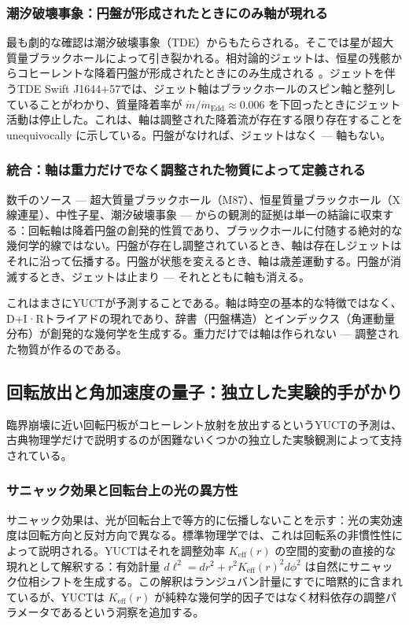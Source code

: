\documentclass[12pt,a4paper]{article}
\begin{document}
	\subsubsection{潮汐破壊事象：円盤が形成されたときにのみ軸が現れる}
	
	最も劇的な確認は潮汐破壊事象（TDE）からもたらされる。そこでは星が超大質量ブラックホールによって引き裂かれる。相対論的ジェットは、恒星の残骸からコヒーレントな降着円盤が形成されたときにのみ生成される \cite{TDE2016,TDE2020}。ジェットを伴うTDE Swift J1644+57では、ジェット軸はブラックホールのスピン軸と整列していることがわかり、質量降着率が \(\dot{m}/\dot{m}_{\text{Edd}} \approx 0.006\) を下回ったときにジェット活動は停止した。これは、軸は調整された降着流が存在する限り存在することを unequivocally に示している。円盤がなければ、ジェットはなく — 軸もない。
	
	\subsubsection{統合：軸は重力だけでなく調整された物質によって定義される}
	
	数千のソース — 超大質量ブラックホール（M87）、恒星質量ブラックホール（X線連星）、中性子星、潮汐破壊事象 — からの観測的証拠は単一の結論に収束する：回転軸は降着円盤の創発的性質であり、ブラックホールに付随する絶対的な幾何学的線ではない。円盤が存在し調整されているとき、軸は存在しジェットはそれに沿って伝播する。円盤が状態を変えるとき、軸は歳差運動する。円盤が消滅するとき、ジェットは止まり — それとともに軸も消える。
	
	これはまさにYUCTが予測することである。軸は時空の基本的な特徴ではなく、D+I·Rトライアドの現れであり、辞書（円盤構造）とインデックス（角運動量分布）が創発的な幾何学を生成する。重力だけでは軸は作られない — 調整された物質が作るのである。
	
	\subsection{回転放出と角加速度の量子：独立した実験的手がかり}
	
	臨界崩壊に近い回転円板がコヒーレント放射を放出するというYUCTの予測は、古典物理学だけで説明するのが困難ないくつかの独立した実験観測によって支持されている。
	
	\subsubsection{サニャック効果と回転台上の光の異方性}
	
	サニャック効果は、光が回転台上で等方的に伝播しないことを示す：光の実効速度は回転方向と反対方向で異なる。標準物理学では、これは回転系の非慣性性によって説明される。YUCTはそれを調整効率 \(K_{\mathrm{eff}}(r)\) の空間的変動の直接的な現れとして解釈する：有効計量 \(d\ell^2 = dr^2 + r^2 K_{\mathrm{eff}}(r)^2 d\phi^2\) は自然にサニャック位相シフトを生成する。この解釈はランジュバン計量にすでに暗黙的に含まれているが、YUCTは \(K_{\mathrm{eff}}(r)\) が純粋な幾何学的因子ではなく材料依存の調整パラメータであるという洞察を追加する。
	
\end{document}
